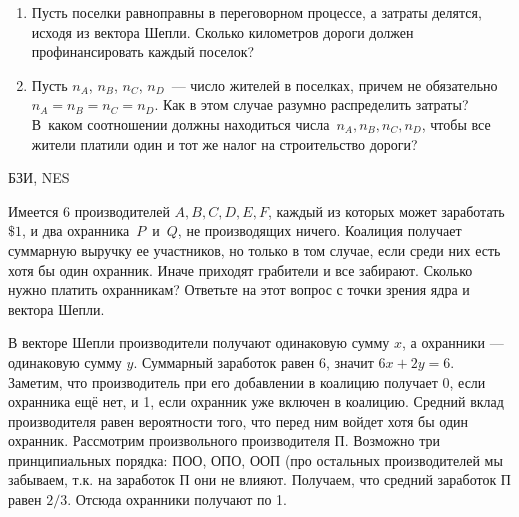 \begin{problem} 
\begin{enumerate}
\item Пусть поселки равноправны в переговорном процессе, а
затраты делятся, исходя из вектора Шепли. Сколько
километров дороги должен профинансировать каждый поселок?

\item Пусть $n_A$, $n_B$, $n_C$, $n_D$~— число жителей в
поселках, причем не обязательно $n_A=n_B=n_C=n_D$. Как в
этом случае разумно распределить затраты? В~каком
соотношении должны находиться числа~$n_A,n_B,n_C,n_D$,
чтобы все жители платили один и тот же налог на
строительство дороги?

\end{enumerate}








\begin{sol}

\end{sol}
\end{problem}




\begin{problem}[Охрана.]\begin{source}
БЗИ, NES
\end{source} Имеется $6$ производителей
$A,B,C,D,E,F$, каждый из которых может заработать~$\$1$, и
два охранника~$P$~и~$Q$, не производящих ничего. Коалиция
получает суммарную выручку ее участников, но только в том
случае, если среди них есть хотя бы один охранник. Иначе
приходят грабители и все забирают. Сколько нужно платить
охранникам? Ответьте на этот вопрос с точки зрения ядра и
вектора Шепли.







\begin{sol}
В векторе Шепли производители получают одинаковую сумму $x$, а охранники — одинаковую сумму $y$. Суммарный заработок равен 6, значит $6x+2y=6$. Заметим, что производитель при его добавлении в коалицию получает 0, если охранника ещё нет, и 1, если охранник уже включен в коалицию. Средний вклад производителя равен вероятности того, что перед ним войдет хотя бы один охранник. Рассмотрим произвольного производителя П. Возможно три принципиальных порядка: ПОО, ОПО, ООП (про остальных производителей мы забываем, т.к. на заработок П они не влияют. Получаем, что средний заработок П равен $2/3$. Отсюда охранники получают по 1.


\end{sol}
\end{problem}




